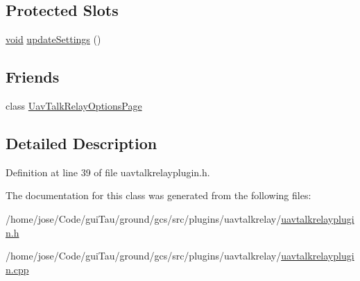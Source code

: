\subsection*{Protected Slots}
\begin{DoxyCompactItemize}
\item 
\hyperlink{group___u_a_v_objects_plugin_ga444cf2ff3f0ecbe028adce838d373f5c}{void} \hyperlink{group___u_a_v_talk_gac6522ac462e3ef789bccecdf33e38779}{update\-Settings} ()
\end{DoxyCompactItemize}
\subsection*{Friends}
\begin{DoxyCompactItemize}
\item 
class \hyperlink{group___u_a_v_talk_gaf20a0868107dbd85408f5bcba4e98063}{Uav\-Talk\-Relay\-Options\-Page}
\end{DoxyCompactItemize}


\subsection{Detailed Description}


Definition at line 39 of file uavtalkrelayplugin.\-h.



The documentation for this class was generated from the following files\-:\begin{DoxyCompactItemize}
\item 
/home/jose/\-Code/gui\-Tau/ground/gcs/src/plugins/uavtalkrelay/\hyperlink{uavtalkrelayplugin_8h}{uavtalkrelayplugin.\-h}\item 
/home/jose/\-Code/gui\-Tau/ground/gcs/src/plugins/uavtalkrelay/\hyperlink{uavtalkrelayplugin_8cpp}{uavtalkrelayplugin.\-cpp}\end{DoxyCompactItemize}
